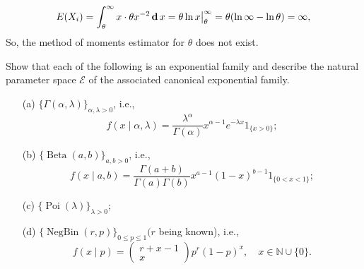 \documentclass[12pt]{article}
\begin{document}
    \begin{solution}
        \[
            E(X_i)=\int_{\theta}^\infty x\cdot \theta x^{-2}\,\mathbf{d}\, x=\theta \ln x \big|_\theta^\infty=\theta(\ln\infty-\ln\theta)=\infty, 
        \]
        So, the method of moments estimator for \(\theta\) does not exist. 
    \end{solution}

    \begin{exercise}
        Show that each of the following is an exponential family and describe the natural parameter space \(\mathcal{E}\) of the associated canonical exponential family.
        \begin{itemize}
            \item[(a)] \(\{\Gamma(\alpha, \lambda)\}_{\alpha, \lambda>0}\), i.e.,
            \[
            f(x \mid \alpha, \lambda)=\frac{\lambda^{\alpha}}{\Gamma(\alpha)} x^{\alpha-1} e^{-\lambda x} 1_{\{x>0\}} ;
            \]
            \item[(b)] \(\{\operatorname{Beta}(a, b)\}_{a, b>0}\), i.e.,
            \[
            f(x \mid a, b)=\frac{\Gamma(a+b)}{\Gamma(a) \Gamma(b)} x^{a-1}(1-x)^{b-1} 1_{\{0<x<1\}} ;
            \]
            \item[(c)] \(\{\operatorname{Poi}(\lambda)\}_{\lambda>0}\);
            \item[(d)] \(\{\operatorname{NegBin}(r, p)\}_{0 \leqslant p \leqslant 1}(r\) being known), i.e.,
            \[
            f(x \mid p)=\left(\begin{array}{c}
            r+x-1 \\
            x
            \end{array}\right) p^{r}(1-p)^{x}, \quad x \in \mathbb{N} \cup\{0\} .
            \]
        \end{itemize}
    \end{exercise}
\end{document}
